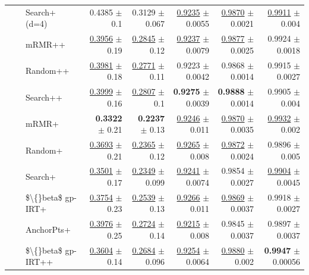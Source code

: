 \begin{longtable}{llp{}rrrrr}
 &  & Search+ (d=4) & 0.4385 {\scriptsize $\pm$ 0.1} & 0.3129 {\scriptsize $\pm$ 0.067} & \underline{0.9235} {\scriptsize $\pm$ 0.0055} & \underline{0.9870} {\scriptsize $\pm$ 0.0021} & \underline{0.9911} {\scriptsize $\pm$ 0.004} \\
 &  & mRMR++ & \underline{0.3956} {\scriptsize $\pm$ 0.19} & \underline{0.2845} {\scriptsize $\pm$ 0.12} & \underline{0.9237} {\scriptsize $\pm$ 0.0079} & \underline{0.9877} {\scriptsize $\pm$ 0.0025} & 0.9924 {\scriptsize $\pm$ 0.0018} \\
 &  & Random++ & \underline{0.3981} {\scriptsize $\pm$ 0.18} & \underline{0.2771} {\scriptsize $\pm$ 0.11} & 0.9223 {\scriptsize $\pm$ 0.0042} & 0.9868 {\scriptsize $\pm$ 0.0014} & 0.9915 {\scriptsize $\pm$ 0.0027} \\
 &  & Search++ & \underline{0.3999} {\scriptsize $\pm$ 0.16} & \underline{0.2807} {\scriptsize $\pm$ 0.1} & \textbf{0.9275} {\scriptsize $\pm$ 0.0039} & \textbf{0.9888} {\scriptsize $\pm$ 0.0014} & 0.9905 {\scriptsize $\pm$ 0.004} \\
 &  & mRMR+ & \textbf{0.3322} {\scriptsize $\pm$ 0.21} & \textbf{0.2237} {\scriptsize $\pm$ 0.13} & \underline{0.9246} {\scriptsize $\pm$ 0.011} & \underline{0.9870} {\scriptsize $\pm$ 0.0035} & \underline{0.9932} {\scriptsize $\pm$ 0.002} \\
 &  & Random+ & \underline{0.3693} {\scriptsize $\pm$ 0.21} & \underline{0.2365} {\scriptsize $\pm$ 0.12} & \underline{0.9265} {\scriptsize $\pm$ 0.008} & \underline{0.9872} {\scriptsize $\pm$ 0.0024} & 0.9896 {\scriptsize $\pm$ 0.005} \\
 &  & Search+ & \underline{0.3501} {\scriptsize $\pm$ 0.17} & \underline{0.2349} {\scriptsize $\pm$ 0.099} & \underline{0.9241} {\scriptsize $\pm$ 0.0074} & 0.9854 {\scriptsize $\pm$ 0.0027} & \underline{0.9904} {\scriptsize $\pm$ 0.0045} \\
 &  & \$\textbackslash\{\}beta\$ gp-IRT+ & \underline{0.3754} {\scriptsize $\pm$ 0.23} & \underline{0.2539} {\scriptsize $\pm$ 0.13} & \underline{0.9266} {\scriptsize $\pm$ 0.011} & \underline{0.9869} {\scriptsize $\pm$ 0.0037} & 0.9918 {\scriptsize $\pm$ 0.0027} \\
 &  & AnchorPts+ & \underline{0.3976} {\scriptsize $\pm$ 0.25} & \underline{0.2724} {\scriptsize $\pm$ 0.14} & \underline{0.9215} {\scriptsize $\pm$ 0.008} & 0.9845 {\scriptsize $\pm$ 0.0037} & 0.9897 {\scriptsize $\pm$ 0.0037} \\
 &  & \$\textbackslash\{\}beta\$ gp-IRT++ & \underline{0.3604} {\scriptsize $\pm$ 0.14} & \underline{0.2684} {\scriptsize $\pm$ 0.096} & \underline{0.9254} {\scriptsize $\pm$ 0.0064} & \underline{0.9880} {\scriptsize $\pm$ 0.002} & \textbf{0.9947} {\scriptsize $\pm$ 0.00056} \\

\end{longtable}
